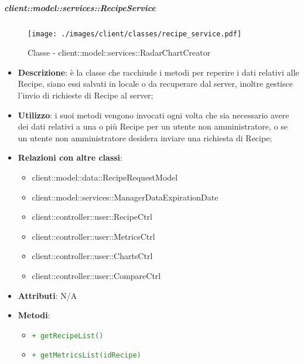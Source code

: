 		\subparagraph{client::model::services::RecipeService} %
		\label{subp:client_model_services_recipeservice}
		\begin{figure}[htbp]
				\centering
				\centerline{\texttt{[image: ./images/client/classes/recipe\_service.pdf]}}
				\caption{Classe - client::model::services::RadarChartCreator}
			\end{figure}
			\begin{itemize}
				\item \textbf{Descrizione}: è la classe che racchiude i metodi per reperire i dati relativi alle Recipe, siano essi salvati in locale o da recuperare dal server, inoltre gestisce l'invio di richieste di Recipe al server;
				\item \textbf{Utilizzo}: i suoi metodi vengono invocati ogni volta che sia necessario avere dei dati relativi a una o più Recipe per un utente non amministratore, o se un utente non amministratore desidera inviare una richiesta di Recipe;
				\item \textbf{Relazioni con altre classi}:
					\begin{itemize}
						\item client::model::data::RecipeRequestModel
						\item client::model::services::ManagerDataExpirationDate
						\item client::controller::user::RecipeCtrl
						\item client::controller::user::MetricsCtrl
						\item client::controller::user::ChartsCtrl
						\item client::controller::user::CompareCtrl
					\end{itemize}
				\item \textbf{Attributi}: N/A
				\item \textbf{Metodi}:
				\begin{itemize}
					\item \textcolor{forestgreen}{\texttt{+ getRecipeList()}}
					\item \textcolor{forestgreen}{\texttt{+ getMetricsList(idRecipe)}}
\end{itemize}
\end{itemize}
